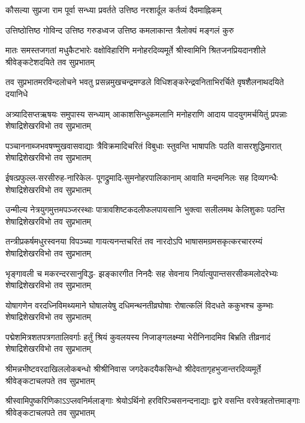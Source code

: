 
\twolineshloka
{कौसल्या सुप्रजा राम पूर्वा सन्ध्या प्रवर्तते}
{उत्तिष्ठ नरशार्दूल कर्तव्यं दैवमाह्निकम्}

\twolineshloka
{उत्तिष्ठोत्तिष्ठ गोविन्द उत्तिष्ठ गरुडध्वज}
{उत्तिष्ठ कमलाकान्त त्रैलोक्यं मङ्गलं कुरु}

\fourlineindentedshloka
{मातः समस्तजगतां मधुकैटभारेः}
{वक्षोविहारिणि मनोहरदिव्यमूर्ते}
{श्रीस्वामिनि श्रितजनप्रियदानशीले}
{श्रीवेङ्कटेशदयिते तव सुप्रभातम्}

\fourlineindentedshloka
{तव सुप्रभातमरविन्दलोचने}
{भवतु प्रसन्नमुखचन्द्रमण्डले}
{विधिशङ्करेन्द्रवनिताभिरर्चिते}
{वृषशैलनाथदयिते दयानिधे}

\fourlineindentedshloka
{अत्र्यादिसप्तऋषयः समुपास्य सन्ध्याम्}
{आकाशसिन्धुकमलानि मनोहराणि}
{आदाय पादयुगमर्चयितुं प्रपन्नाः}
{शेषाद्रिशेखरविभो तव सुप्रभातम्}

\fourlineindentedshloka
{पञ्चाननाब्जभवषण्मुखवासवाद्याः}
{त्रैविक्रमादिचरितं विबुधाः स्तुवन्ति}
{भाषापतिः पठति वासरशुद्धिमारात्}
{शेषाद्रिशेखरविभो तव सुप्रभातम्}

\fourlineindentedshloka
{ईषत्प्रफुल्ल-सरसीरुह-नारिकेल-}
{पूगद्रुमादि-सुमनोहरपालिकानाम्}
{आवाति मन्दमनिलः सह दिव्यगन्धैः}
{शेषाद्रिशेखरविभो तव सुप्रभातम्}

\fourlineindentedshloka
{उन्मील्य नेत्रयुगमुत्तमपञ्जरस्थाः}
{पात्रावशिष्टकदलीफलपायसानि}
{भुक्त्वा सलीलमथ केलिशुकाः पठन्ति}
{शेषाद्रिशेखरविभो तव सुप्रभातम्}

\fourlineindentedshloka
{तन्त्रीप्रकर्षमधुरस्वनया विपञ्च्या}
{गायत्यनन्तचरितं तव नारदोऽपि}
{भाषासमग्रमसकृत्करचाररम्यं}
{शेषाद्रिशेखरविभो तव सुप्रभातम्}

\fourlineindentedshloka
{भृङ्गावली च मकरन्दरसानुविद्ध-}
{झङ्कारगीत निनदैः सह सेवनाय}
{निर्यात्युपान्तसरसीकमलोदरेभ्यः}
{शेषाद्रिशेखरविभो तव सुप्रभातम्}

\fourlineindentedshloka
{योषागणेन वरदध्निविमथ्यमाने}
{घोषालयेषु दधिमन्थनतीव्रघोषाः}
{रोषात्कलिं विदधते ककुभश्च कुम्भाः}
{शेषाद्रिशेखरविभो तव सुप्रभातम्}

\fourlineindentedshloka
{पद्मेशमित्रशतपत्रगतालिवर्गाः}
{हर्तुं श्रियं कुवलयस्य निजाङ्गलक्ष्म्या}
{भेरीनिनादमिव बिभ्रति तीव्रनादं}
{शेषाद्रिशेखरविभो तव सुप्रभातम्}

\fourlineindentedshloka
{श्रीमन्नभीष्टवरदाखिललोकबन्धो}
{श्रीश्रीनिवास जगदेकदयैकसिन्धो}
{श्रीदेवतागृहभुजान्तरदिव्यमूर्ते}
{श्रीवेङ्कटाचलपते तव सुप्रभातम्}

\fourlineindentedshloka
{श्रीस्वामिपुष्करिणिकाऽऽप्लवनिर्मलाङ्गाः}
{श्रेयोऽर्थिनो हरविरिञ्चसनन्दनाद्याः}
{द्वारे वसन्ति वरवेत्रहतोत्तमाङ्गाः}
{श्रीवेङ्कटाचलपते तव सुप्रभातम्}

